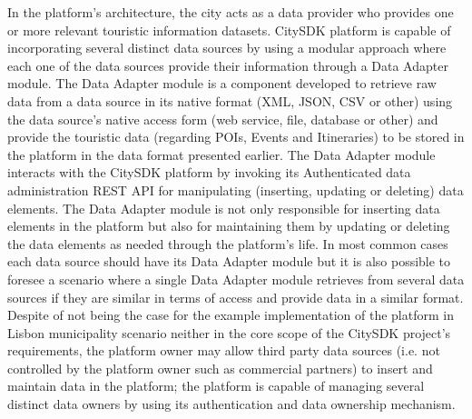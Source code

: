 \documentclass[times]{ettauth}
\begin{document}
In the platform's architecture, the city acts as a data provider who provides one or more relevant touristic information datasets. CitySDK platform is capable of incorporating several distinct data sources by using a modular approach where each one of the data sources provide their information through a Data Adapter module. 
The Data Adapter module is a component developed to retrieve raw data from a data source in its native format (XML, JSON, CSV or other) using the data source's native access form (web service, file, database or other) and provide the touristic data (regarding \acp{POI}, Events and Itineraries) to be stored in the platform in the data format presented earlier. 
The Data Adapter module interacts with the CitySDK platform by invoking its Authenticated data administration REST API for manipulating (inserting, updating or deleting) data elements. 
The Data Adapter module is not only responsible for inserting data elements in the platform but also for maintaining them by updating or deleting the data elements as needed through the platform's life. 
In most common cases each data source should have its Data Adapter module but it is also possible to foresee a scenario where a single Data Adapter module retrieves from several data sources if they are similar in terms of access and provide data in a similar format. 
Despite of not being the case for the example implementation of the platform in Lisbon municipality scenario neither in the core scope of the CitySDK project's requirements, the platform owner may allow third party data sources (i.e. not controlled by the platform owner such as commercial partners) to insert and maintain data in the platform; the platform is capable of managing several distinct data owners by using its authentication and data ownership mechanism.
\end{document}

